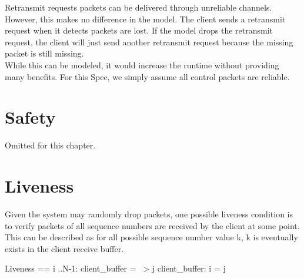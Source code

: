 Retransmit requests packets can be delivered through unreliable channels. However,
this makes no difference in the model. The client sends a retransmit request
when it detects packets are lost. If the model drops the retransmit request, the
client will just send another retransmit request because the missing packet is
still missing.\\

While this can be modeled, it would increase the runtime without providing many
benefits. For this Spec, we simply assume all control packets are reliable. 

\section{Safety}

Omitted for this chapter.

\section{Liveness}

Given the system may randomly drop packets, one possible liveness condition is
to verify packets of all sequence numbers are received by the client at some
point. This can be described as for all possible sequence number value k, k is
eventually exists in the client receive buffer.\\

\begin{tla}
Liveness == 
    \A i ..N-1:
        client_buffer = {} ~> \E j \in client_buffer: i = j 
\end{tla}
\begin{tlatex}
%
%
\end{tlatex}

% 
